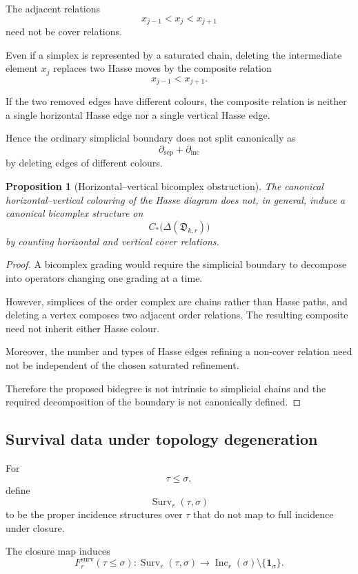 \documentclass[11pt]{article}
\theoremstyle{plain}
\newtheorem{proposition}[theorem]{Proposition}
\theoremstyle{definition}
\begin{document}
The adjacent relations
\[
x_{j-1}<x_j<x_{j+1}
\]
need not be cover relations.

Even if a simplex is represented by a saturated chain, deleting the
intermediate element $x_j$ replaces two Hasse moves by the composite
relation
\[
x_{j-1}<x_{j+1}.
\]

If the two removed edges have different colours, the composite relation
is neither a single horizontal Hasse edge nor a single vertical Hasse
edge.

Hence the ordinary simplicial boundary does not split canonically as
\[
\partial_{\mathrm{sep}}
+
\partial_{\mathrm{inc}}
\]
by deleting edges of different colours.

\begin{proposition}[Horizontal--vertical bicomplex obstruction]
\label{prop:naive-bicomplex-obstruction}
The canonical horizontal--vertical colouring of the Hasse diagram does
not, in general, induce a canonical bicomplex structure on
\[
C_*
\bigl(
\Delta(\mathfrak D_{k,r})
\bigr)
\]
by counting horizontal and vertical cover relations.
\end{proposition}

\begin{proof}
A bicomplex grading would require the simplicial boundary to decompose
into operators changing one grading at a time.

However, simplices of the order complex are chains rather than Hasse
paths, and deleting a vertex composes two adjacent order relations.
The resulting composite need not inherit either Hasse colour.

Moreover, the number and types of Hasse edges refining a non-cover
relation need not be independent of the chosen saturated refinement.

Therefore the proposed bidegree is not intrinsic to simplicial chains
and the required decomposition of the boundary is not canonically
defined.
\end{proof}


\subsection{Survival data under topology degeneration}
\label{subsec:survival-data-horizontal}

For
\[
\tau\leq\sigma,
\]
define
\[
\operatorname{Surv}_r(\tau,\sigma)
\]
to be the proper incidence structures over $\tau$ that do not map to
full incidence under closure.

The closure map induces
\[
F_r^{\mathrm{surv}}(\tau\leq\sigma):
\operatorname{Surv}_r(\tau,\sigma)
\longrightarrow
\operatorname{Inc}_r(\sigma)
\setminus
\{\mathbf1_\sigma\}.
\]
\end{document}
